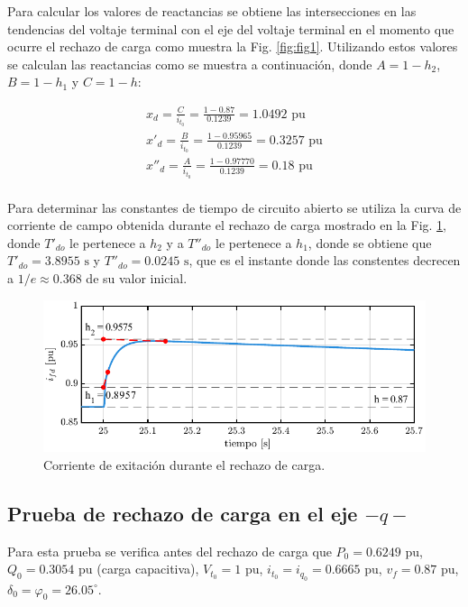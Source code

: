 \documentclass[conference]{IEEEtran}
\begin{document}
Para calcular los valores de reactancias se obtiene las intersecciones en las tendencias del
voltaje terminal con el eje del voltaje terminal en el momento que ocurre el rechazo de carga
como muestra la Fig. \ref{fig:fig1}. Utilizando estos valores se calculan las reactancias como
se muestra a continuación, donde $A=1-h_2$, $B=1-h_1$ y $C=1-h$:

\begin{gather*}
x_d = \frac{C}{i_{t_0}} = \frac{1 - 0.87}{0.1239} = 1.0492\text{ pu} \\
x'_{d} = \frac{B}{i_{t_0}} = \frac{1 - 0.95965}{0.1239} = 0.3257\text{ pu}\\
x''_{d} = \frac{A}{i_{t_0}} = \frac{1 - 0.97770}{0.1239} = 0.18\text{ pu}\\
\end{gather*}

Para determinar las constantes de tiempo de circuito abierto se utiliza la curva de corriente de campo
obtenida durante el rechazo de carga mostrado en la Fig. \ref{fig:fig2}, donde $T'_{do}$ le pertenece a $h_2$ y a $T''_{do}$ le pertenece a $h_1$,
donde se obtiene que $T'_{do} = 3.8955\text{ s}$ y $T''_{do} = 0.0245\text{ s}$, que es el instante donde las constentes decrecen a $1/e \approx 0.368$ de su valor inicial.\cite{IEEE115,IEEE1110}

\begin{figure}[H]
    \centering
    \includegraphics[width=\linewidth]{Fig/fig2.pdf}
    \caption{Corriente de exitación durante el rechazo de carga.}
    \label{fig:fig2}
\end{figure}

\subsection{Prueba de rechazo de carga en el eje $-q-$}
Para esta prueba se verifica antes del rechazo de carga que $P_0 = 0.6249\text{ pu}$, $Q_0 = 0.3054\text{ pu}$ (carga
capacitiva), $V_{t_0} = 1\text{ pu}$, $i_{t_0} = i_{q_0} = 0.6665\text{ pu}$, $v_f = 0.87\text{ pu}$, $\delta_0 = \varphi_0 = 26.05^{\circ}$.
\end{document}
